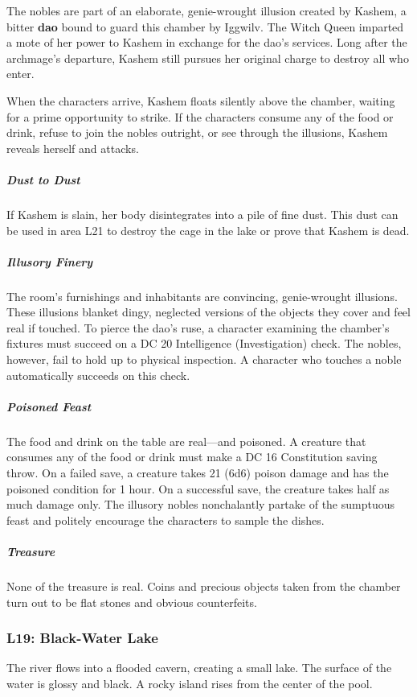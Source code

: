 \documentclass[10pt,a4paper,twoside,bg=print,twocolumn,openany,nodeprecatedcode]{dndbook}
\begin{document}
The nobles are part of an elaborate, genie-wrought illusion created by Kashem, a bitter \textbf{dao} bound to guard this chamber by Iggwilv. The Witch Queen imparted a mote of her power to Kashem in exchange for the dao's services. Long after the archmage's departure, Kashem still pursues her original charge to destroy all who enter.

When the characters arrive, Kashem floats silently above the chamber, waiting for a prime opportunity to strike. If the characters consume any of the food or drink, refuse to join the nobles outright, or see through the illusions, Kashem reveals herself and attacks.

\subparagraph{Dust to Dust}
If Kashem is slain, her body disintegrates into a pile of fine dust. This dust can be used in area L21 to destroy the cage in the lake or prove that Kashem is dead.

\subparagraph{Illusory Finery}
The room's furnishings and inhabitants are convincing, genie-wrought illusions. These illusions blanket dingy, neglected versions of the objects they cover and feel real if touched. To pierce the dao's ruse, a character examining the chamber's fixtures must succeed on a DC 20 Intelligence (Investigation) check. The nobles, however, fail to hold up to physical inspection. A character who touches a noble automatically succeeds on this check.

\subparagraph{Poisoned Feast}
The food and drink on the table are real—and poisoned. A creature that consumes any of the food or drink must make a DC 16 Constitution saving throw. On a failed save, a creature takes 21 (6d6) poison damage and has the poisoned condition for 1 hour. On a successful save, the creature takes half as much damage only. The illusory nobles nonchalantly partake of the sumptuous feast and politely encourage the characters to sample the dishes.

\subparagraph{Treasure}
None of the treasure is real. Coins and precious objects taken from the chamber turn out to be flat stones and obvious counterfeits.

\subsubsection{L19: Black-Water Lake}
\begin{DndReadAloud}{}
The river flows into a flooded cavern, creating a small lake. The surface of the water is glossy and black. A rocky island rises from the center of the pool.

\end{DndReadAloud}
\end{document}

